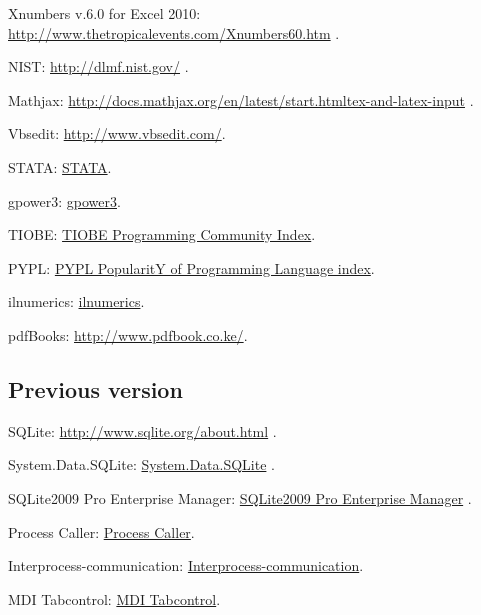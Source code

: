 	
	Xnumbers v.6.0 for Excel 2010:  \href{http://www.thetropicalevents.com/Xnumbers60.htm}{http://www.thetropicalevents.com/Xnumbers60.htm} .
	
	
	NIST: \href{http://dlmf.nist.gov/}{http://dlmf.nist.gov/} .
	
	Mathjax: \href{http://docs.mathjax.org/en/latest/start.html#tex-and-latex-input}{http://docs.mathjax.org/en/latest/start.htmltex-and-latex-input} .
	
	Vbsedit: \href{http://www.vbsedit.com/}{http://www.vbsedit.com/}.
	
	STATA: \href{http://www.stata.com/}{STATA}.
	
	gpower3: \href{http://www.psycho.uni-duesseldorf.de/abteilungen/aap/gpower3/download-and-register}{gpower3}.
	
	TIOBE: \href{http://www.tiobe.com/index.php/content/paperinfo/tpci/index.html}{TIOBE Programming Community Index}.
	
	PYPL: \href{https://sites.google.com/site/pydatalog/pypl/PyPL-PopularitY-of-Programming-Language}{PYPL PopularitY of Programming Language index}.
	
	ilnumerics: \href{http://ilnumerics.net/index.html}{ilnumerics}.
	
	pdfBooks: \href{http://www.pdfbook.co.ke/}{http://www.pdfbook.co.ke/}.
	
	
	
	
	\subsection{Previous version}
	
	SQLite: \href{http://www.sqlite.org/about.html}{http://www.sqlite.org/about.html} .
	
	System.Data.SQLite: \href{http://system.data.sqlite.org/index.html/doc/trunk/www/index.wiki}{System.Data.SQLite} .
	
	SQLite2009 Pro Enterprise Manager: \href{http://osenxpsuite.net/download.htm}{SQLite2009 Pro Enterprise Manager} .
	
	
	
	Process Caller: \href{http://www.codeproject.com/Articles/4665/Launching-a-process-and-displaying-its-standard-ou}{Process Caller}.
	
	Interprocess-communication: \href{http://www.codeproject.com/Articles/6945/VB-NET-VB6-and-C-Interprocess-communication-via-Wi}{Interprocess-communication}.
	
	MDI Tabcontrol: \href{http://www.codeproject.com/Articles/16436/A-highly-configurable-MDI-tab-control-from-scratch}{MDI Tabcontrol}.
	
